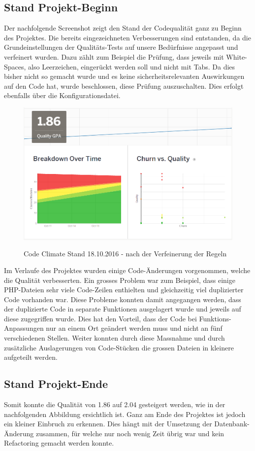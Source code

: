 \subsection{Stand Projekt-Beginn}
Der nachfolgende Screenshot zeigt den Stand der Codequalität ganz zu Beginn des Projektes. Die bereits eingezeichneten Verbesserungen sind entstanden, da die Grundeinstellungen der Qualitäts-Tests auf unsere Bedürfnisse angepasst und verfeinert wurden. Dazu zählt zum Beispiel die Prüfung, dass jeweils mit White-Spaces, also Leerzeichen, eingerückt werden soll und nicht mit Tabs. Da dies bisher nicht so gemacht wurde und es keine sicherheitsrelevanten Auswirkungen auf den Code hat, wurde beschlossen, diese Prüfung auszuschalten. Dies erfolgt ebenfalls über die Konfigurationsdatei.

\begin{figure}[H]
	\centering
	\includegraphics[width=.7\textwidth]{Images/CodeClimate_Beginn.PNG}
	\caption{Code Climate Stand 18.10.2016 - nach der Verfeinerung der Regeln}
	\cite{codeclimate.com}
\end{figure}

Im Verlaufe des Projektes wurden einige Code-Änderungen vorgenommen, welche die Qualität verbesserten. Ein grosses Problem war zum Beispiel, dass einige PHP-Dateien sehr viele Code-Zeilen enthielten und gleichzeitig viel duplizierter Code vorhanden war. Diese Probleme konnten damit angegangen werden, dass der duplizierte Code in separate Funktionen ausgelagert wurde und jeweils auf diese zugegriffen wurde. Dies hat den Vorteil, dass der Code bei Funktions-Anpassungen nur an einem Ort geändert werden muss und nicht an fünf verschiedenen Stellen. Weiter konnten durch diese Massnahme und durch zusätzliche Auslagerungen von Code-Stücken die grossen Dateien in kleinere aufgeteilt werden. \\

\subsection{Stand Projekt-Ende}
Somit konnte die Qualität von 1.86 auf 2.04 gesteigert werden, wie in der nachfolgenden Abbildung ersichtlich ist. Ganz am Ende des Projektes ist jedoch ein kleiner Einbruch zu erkennen. Dies hängt mit der Umsetzung der Datenbank-Änderung zusammen, für welche nur noch wenig Zeit übrig war und kein \gls{Refactoring} gemacht werden konnte.

